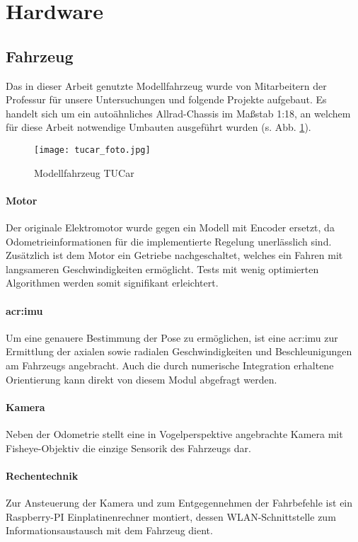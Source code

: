 \section{Hardware \dcsecondauthorshort}
\subsection{Fahrzeug}
Das in dieser Arbeit genutzte Modellfahrzeug wurde von Mitarbeitern der Professur für unsere Untersuchungen und folgende Projekte aufgebaut. Es handelt sich um ein autoähnliches Allrad-Chassis im Maßstab 1:18, an welchem für diese Arbeit notwendige Umbauten ausgeführt wurden (s. Abb. \ref{fig:tucar_foto}).
\begin{figure}[H] %
	\centering
	\texttt{[image: tucar\_foto.jpg]}
	\caption{Modellfahrzeug \glqq TUCar \grqq}
	\label{fig:tucar_foto}
\end{figure}
\paragraph{Motor}
Der originale Elektromotor wurde gegen ein Modell mit Encoder ersetzt, da Odometrieinformationen für die implementierte Regelung unerlässlich sind. Zusätzlich ist dem Motor ein Getriebe nachgeschaltet, welches ein Fahren mit langsameren Geschwindigkeiten ermöglicht. Tests mit wenig optimierten Algorithmen werden somit signifikant erleichtert.
\paragraph{\gls{acr:imu}}
Um eine genauere Bestimmung der Pose zu ermöglichen, ist eine \gls{acr:imu} zur Ermittlung der axialen sowie radialen Geschwindigkeiten und Beschleunigungen am Fahrzeugs angebracht. Auch die durch numerische Integration erhaltene Orientierung kann direkt von diesem Modul abgefragt werden. 
\paragraph{Kamera}
Neben der Odometrie stellt eine in Vogelperspektive angebrachte Kamera mit Fisheye-Objektiv die einzige Sensorik des Fahrzeugs dar.
\paragraph{Rechentechnik}
Zur Ansteuerung der Kamera und zum Entgegennehmen der Fahrbefehle ist ein Raspberry-PI Einplatinenrechner montiert, dessen WLAN-Schnittstelle zum Informationsaustausch mit dem Fahrzeug dient.
